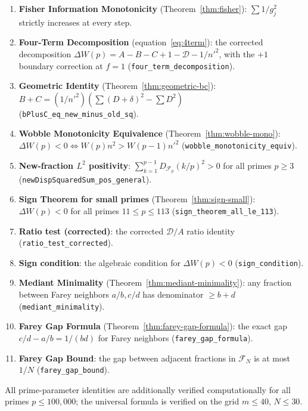 \documentclass[11pt]{article}
\theoremstyle{definition}
\newcommand{\F}{\mathcal{F}}
\begin{document}
\begin{enumerate}
    (Theorem~\ref{thm:mediant}):
    every new Farey fraction is the mediant of its neighbors.
  \item \textbf{Fisher Information Monotonicity}
    (Theorem~\ref{thm:fisher}):
    $\sum 1/g_j^2$ strictly increases at every step.
  \item \textbf{Four-Term Decomposition}
    (equation~\eqref{eq:4term}):
    the corrected decomposition
    $\Delta W(p) = A - B - C + 1 - \mathcal{D} - 1/{n'}^2$,
    with the $+1$ boundary correction at $f = 1$
    (\texttt{four\_term\_decomposition}).
  \item \textbf{Geometric Identity}
    (Theorem~\ref{thm:geometric-bc}):
    $B + C = (1/{n'}^2)(\sum(D+\delta)^2 - \sum D^2)$
    (\texttt{bPlusC\_eq\_new\_minus\_old\_sq}).
  \item \textbf{Wobble Monotonicity Equivalence}
    (Theorem~\ref{thm:wobble-mono}):
    $\Delta W(p) < 0 \Leftrightarrow W(p) n^2 > W(p-1) {n'}^2$
    (\texttt{wobble\_monotonicity\_equiv}).
  \item \textbf{New-fraction $L^2$ positivity}:
    $\sum_{k=1}^{p-1} D_{\F_p}(k/p)^2 > 0$ for all primes
    $p \ge 3$ (\texttt{newDispSquaredSum\_pos\_general}).
  \item \textbf{Sign Theorem for small primes}
    (Theorem~\ref{thm:sign-small}):
    $\Delta W(p) < 0$ for all primes $11 \le p \le 113$
    (\texttt{sign\_theorem\_all\_le\_113}).
  \item \textbf{Ratio test (corrected)}:
    the corrected $\mathcal{D}/A$ ratio identity
    (\texttt{ratio\_test\_corrected}).
  \item \textbf{Sign condition}:
    the algebraic condition for $\Delta W(p) < 0$
    (\texttt{sign\_condition}).
  \item \textbf{Mediant Minimality}
    (Theorem~\ref{thm:mediant-minimality}):
    any fraction between Farey neighbors $a/b, c/d$ has
    denominator $\ge b + d$
    (\texttt{mediant\_minimality}).
  \item \textbf{Farey Gap Formula}
    (Theorem~\ref{thm:farey-gap-formula}):
    the exact gap $c/d - a/b = 1/(bd)$ for Farey neighbors
    (\texttt{farey\_gap\_formula}).
  \item \textbf{Farey Gap Bound}:
    the gap between adjacent fractions in $\F_N$ is at most
    $1/N$ (\texttt{farey\_gap\_bound}).
\end{enumerate}

\noindent All prime-parameter identities are additionally verified
computationally for all primes $p \le 100{,}000$; the universal
formula is verified on the grid $m \le 40$, $N \le 30$.
\end{document}
